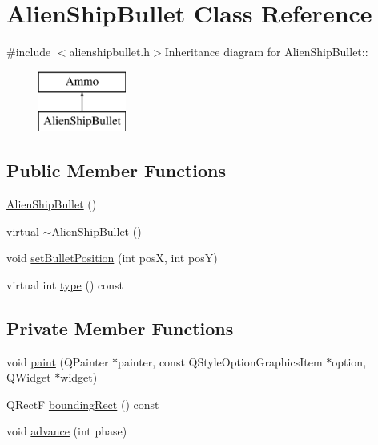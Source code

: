\hypertarget{class_alien_ship_bullet}{
\section{AlienShipBullet Class Reference}
\label{class_alien_ship_bullet}
}


{\ttfamily \#include $<$alienshipbullet.h$>$}Inheritance diagram for AlienShipBullet::\begin{figure}[H]
\begin{center}
\leavevmode
\includegraphics[height=2cm]{class_alien_ship_bullet}
\end{center}
\end{figure}
\subsection*{Public Member Functions}
\begin{DoxyCompactItemize}
\item 
\hyperlink{class_alien_ship_bullet_a0fa00d03540ce06da0855960709baddb}{AlienShipBullet} ()
\item 
virtual \hyperlink{class_alien_ship_bullet_a6af8a67dca6b5da79602a4f1c5d06c7f}{$\sim$AlienShipBullet} ()
\item 
void \hyperlink{class_alien_ship_bullet_ad00b6010d2f96d497bc796067aae428b}{setBulletPosition} (int posX, int posY)
\item 
virtual int \hyperlink{class_alien_ship_bullet_ab12e8a371cf9565051a3f6e9d7fb54b5}{type} () const 
\end{DoxyCompactItemize}
\subsection*{Private Member Functions}
\begin{DoxyCompactItemize}
\item 
void \hyperlink{class_alien_ship_bullet_a24f6404671b0e0ef258a8d7814ead18b}{paint} (QPainter $\ast$painter, const QStyleOptionGraphicsItem $\ast$option, QWidget $\ast$widget)
\item 
QRectF \hyperlink{class_alien_ship_bullet_a0a7aa5b5707281f2d204f903650df560}{boundingRect} () const 
\item 
void \hyperlink{class_alien_ship_bullet_a29af8ac3011d72e8b845019e76ab203d}{advance} (int phase)
\end{DoxyCompactItemize}
